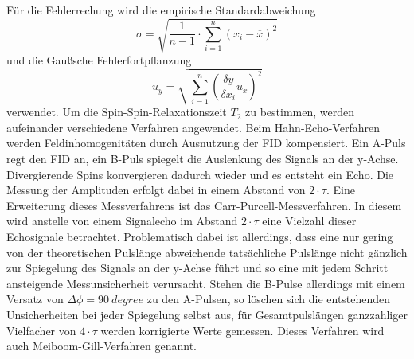 \noindent Für die Fehlerrechung wird die empirische Standardabweichung
\begin{equation}
  \sigma = \sqrt{\frac{1}{n-1} \cdot \sum_{i=1}^n(x_i-\overline{x})^2}
  \label{eqn:Stdabweichung}
\end{equation}
und die Gaußsche Fehlerfortpflanzung
\begin{equation}
  u_y = \sqrt{\sum_{i=1}^n\left(\frac{\delta y}{\delta x_i}u_x\right)^2}
  \label{eqn:gauß}
\end{equation}
verwendet.
\noindent Um die Spin-Spin-Relaxationszeit $T_2$ zu bestimmen, werden
aufeinander verschiedene Verfahren angewendet. Beim Hahn-Echo-Verfahren werden
Feldinhomogenitäten durch Ausnutzung der FID kompensiert. Ein A-Puls regt den
FID an, ein B-Puls spiegelt die Auslenkung des Signals an der y-Achse.
Divergierende Spins konvergieren dadurch wieder und es entsteht ein Echo. Die
Messung der Amplituden erfolgt dabei in einem Abstand von $2 \cdot \tau$. Eine
Erweiterung dieses Messverfahrens ist das Carr-Purcell-Messverfahren. In diesem
wird anstelle von einem Signalecho im Abstand $2 \cdot \tau$ eine Vielzahl
dieser Echosignale betrachtet. Problematisch dabei ist allerdings, dass eine
nur gering von der theoretischen Pulslänge abweichende tatsächliche
Pulslänge nicht gänzlich zur Spiegelung des Signals an der y-Achse führt und
so eine mit jedem Schritt ansteigende Messunsicherheit verursacht. Stehen die
B-Pulse allerdings mit einem Versatz von $\Delta \phi = \SI{90}{degree}$ zu den
A-Pulsen, so löschen sich die entstehenden Unsicherheiten bei jeder Spiegelung
selbst aus, für Gesamtpulslängen ganzzahliger Vielfacher von $4 \cdot \tau$
werden korrigierte Werte gemessen. Dieses Verfahren wird auch
Meiboom-Gill-Verfahren genannt.  
